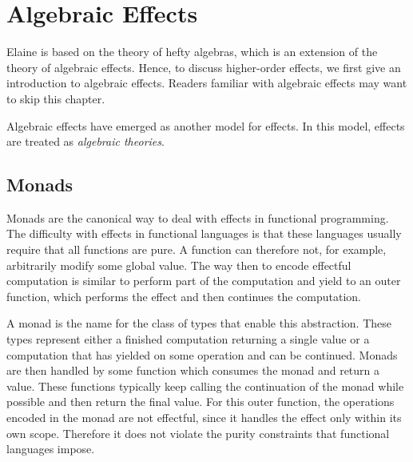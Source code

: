 %
%

\chapter{Algebraic Effects}\label{chap:algebraic_effects}

Elaine is based on the theory of hefty algebras, which is an extension of the theory of algebraic effects. Hence, to discuss higher-order effects, we first give an introduction to algebraic effects. Readers familiar with algebraic effects may want to skip this chapter.

Algebraic effects have emerged as another model for effects. In this model, effects are treated as \emph{algebraic theories}.

\section{Monads}



Monads are the canonical way to deal with effects in functional programming. The difficulty with effects in functional languages is that these languages usually require that all functions are pure. A function can therefore not, for example, arbitrarily modify some global value. The way then to encode effectful computation is similar to perform part of the computation and yield to an outer function, which performs the effect and then continues the computation.

A monad is the name for the class of types that enable this abstraction. These types represent either a finished computation returning a single value or a computation that has yielded on some operation and can be continued. Monads are then handled by some function which consumes the monad and return a value. These functions typically keep calling the continuation of the monad while possible and then return the final value. For this outer function, the operations encoded in the monad are not effectful, since it handles the effect only within its own scope. Therefore it does not violate the purity constraints that functional languages impose.

